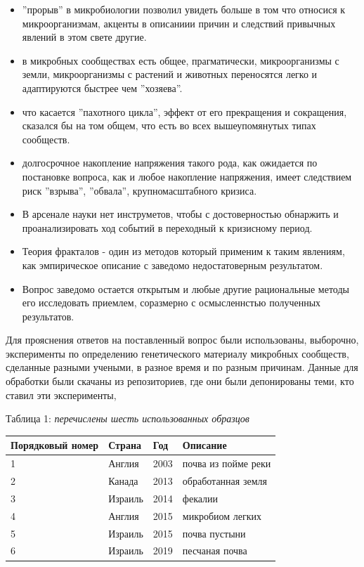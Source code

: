 \documentclass[a4paper]{article}
\begin{document}
\begin{itemize}

\item ''прорыв'' в микробиологии позволил увидеть больше в том что относися к микроорганизмам, акценты в описаниии причин и следствий привычных явлений в этом свете другие.

\item в микробных сообществах есть общее, прагматически, микроорганизмы с земли, микроорганизмы с растений и животных переносятся легко и адаптируются быстрее чем ''хозяева''.

\item что касается ''пахотного цикла'', эффект от его прекращения и сокращения, сказался бы на том общем, что есть во всех вышеупомянутых типах сообществ.

\item долгосрочное накопление напряжения такого рода, как ожидается по постановке вопроса, как и любое накопление напряжения, имеет следствием риск ''взрыва'', ''обвала'', крупномасштабного кризиса. 

\item В арсенале науки нет инструметов, чтобы с достоверностью обнаржить и проанализировать ход событий в переходный к кризисному период. 

\item Теория фракталов - один из методов который применим к таким явлениям, как эмпирическое описание с заведомо недостатоверным результатом. 

\item Вопрос заведомо остается открытым и любые другие рациональные методы его исследовать приемлем, соразмерно с осмысленнстью полученных результатов.


\end{itemize}

Для прояснения ответов на поставленный вопрос были использованы, выборочно, эксперименты по определению генетического материалу микробных сообществ, сделанные разными учеными, в разное время и по разным причинам. Данные для обработки были скачаны из репозиториев, где они были депонированы теми, кто ставил эти эксперименты, 

Таблица 1: \textit{перечислены шесть использованных образцов} 

\begin{tabular}{llll}
\hline
Порядковый номер&Страна&Год&Описание\\
\hline
1&Англия&2003&почва из пойме реки\\
2&Канада&2013&обработанная земля\\
3&Израиль&2014&фекалии\\
4&Англия&2015&микробиом легких\\
5&Израиль&2015&почва пустыни\\
6&Израиль&2019&песчаная почва\\
\hline
\end{tabular}
\end{document}
